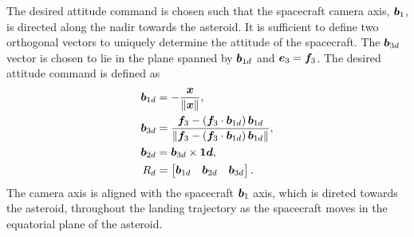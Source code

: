 \documentclass[letterpaper, paper,11pt]{AAS}		%
\begin{document}
The desired attitude command is chosen such that the spacecraft camera axis, \( \bm{b}_1 \), is directed along the nadir towards the asteroid.
It is sufficient to define two orthogonal vectors to uniquely determine the attitude of the spacecraft.
The \( \bm{b}_{3d} \) vector is chosen to lie in the plane spanned by \(\bm{b}_{1d} \) and \( \bm{e}_3 = \bm{f}_3 \).
The desired attitude command is defined as
\begin{align}
    \bm{b}_{1d} &= - \frac{\bm{x}}{\left\| \bm{x} \right\|} , \\
    \bm{b}_{3d} &= \frac{\bm{f}_3 - \left( \bm{f}_3 \cdot \bm{b}_{1d} \right) \bm{b}_{1d}}{\left\| \bm{f}_3 - \left( \bm{f}_3 \cdot \bm{b}_{1d} \right) \bm{b}_{1d} \right\|}, \\
    \bm{b}_{2d} &= \bm{b}_{3d} \times \bm{1d} , \\
R_d &= \begin{bmatrix} \bm{b}_{1d} & \bm{b}_{2d} & \bm{b}_{3d} \end{bmatrix} .
\end{align}
The camera axis is aligned with the spacecraft \( \bm{b}_ 1 \) axis, which is direted towards the asteroid, throughout the landing trajectory as the spacecraft moves in the equatorial plane of the asteroid.
\end{document}
